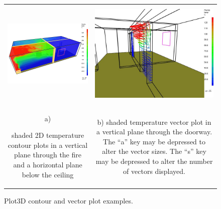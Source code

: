 \documentclass[11pt,twoside]{book}
\newcommand{\figoptions}{hbp}
\begin{document}
\begin{figure}[\figoptions]
\begin{center}
\begin{tabular}{cc}
\includegraphics[height=2.0in]{figures/roomfire_plot3d}
&\includegraphics[height=2.0in]{figures/roomfire_plot3dv}\\
a)

\parbox[t]{2.5in}{shaded 2D temperature contour plots in a vertical plane through the fire and a
horizontal plane below the ceiling}
&
b)
\parbox[t]{2.5in}{shaded temperature vector plot in a vertical plane through the doorway.
The ``a'' key may be depressed to alter the vector sizes.
The ``s'' key may be depressed to alter the number of vectors displayed.
}
\end{tabular}
\end{center}
\caption{Plot3D contour and vector plot examples.  }
\label{fig2dcontour}%
\label{figvector2}
\end{figure}
\end{document}
